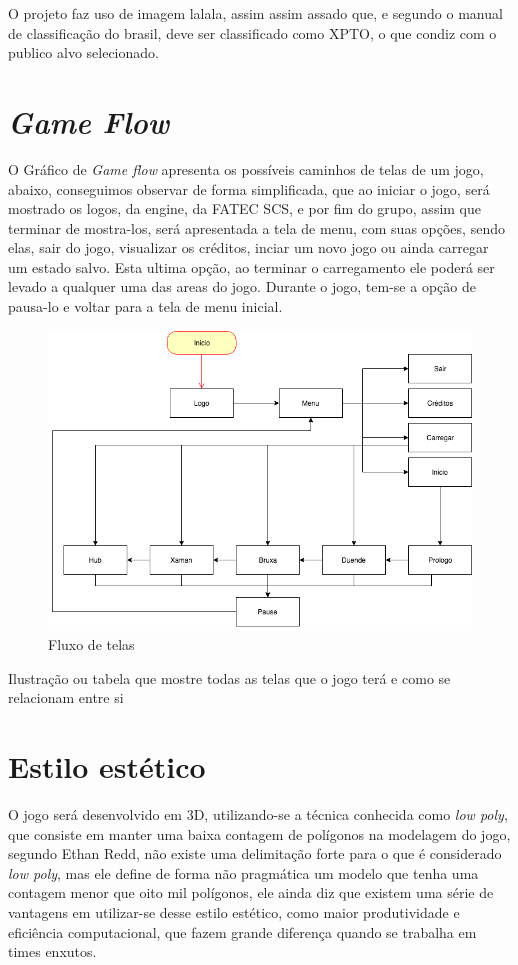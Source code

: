 O projeto faz uso de imagem lalala, assim assim assado que, e segundo o manual de classificação do brasil, deve ser classificado como XPTO, o que condiz com o publico alvo selecionado.

\vfill \pagebreak

\section{\textit{Game Flow}}

O Gráfico de \textit{Game flow} apresenta os possíveis caminhos de telas de um jogo, abaixo, conseguimos observar de forma simplificada, que ao iniciar o jogo, será mostrado os logos, da engine, da FATEC SCS, e por fim do grupo, assim que terminar de mostra-los, será apresentada a tela de menu, com suas opções, sendo elas, sair do jogo, visualizar os créditos, inciar um novo jogo ou ainda carregar um estado salvo. Esta ultima opção, ao terminar o carregamento ele poderá ser levado a qualquer uma das areas do jogo.
Durante o jogo, tem-se a opção de pausa-lo e voltar para a tela de menu inicial.


\begin{figure}[!htb]
    \caption{\label{fig_grafico}Fluxo de telas} \begin{center}
    \includegraphics[width=\textwidth]{imagens/Flow.png} \end{center}
 \end{figure} Ilustração ou tabela que mostre
todas as telas que o jogo terá e como se relacionam entre si

\section{Estilo estético}
O jogo será desenvolvido em 3D, utilizando-se a técnica conhecida como \textit{low poly}, que consiste em manter uma baixa contagem de polígonos na modelagem do jogo, segundo Ethan Redd, não existe uma delimitação forte para o que é considerado \textit{low poly}, mas ele define de forma não pragmática um modelo que tenha uma contagem menor que oito mil polígonos, ele ainda diz que existem uma série de vantagens em utilizar-se desse estilo estético, como maior produtividade e eficiência computacional, que fazem grande diferença quando se trabalha em times enxutos.

